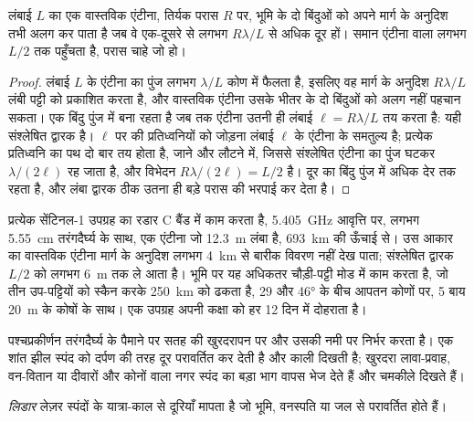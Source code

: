 \begin{proposition}[दिगंश विभेदन]\label{prop:b3:remote-sensing-gis:azimuth}
लंबाई $L$ का एक वास्तविक एंटीना, तिर्यक परास $R$ पर, भूमि के दो बिंदुओं को
अपने मार्ग के अनुदिश तभी अलग कर पाता है जब वे एक-दूसरे से लगभग $R\lambda/L$ से अधिक दूर हों।
समान एंटीना वाला  लगभग $L/2$ तक पहुँचता है,
परास चाहे जो हो।
\end{proposition}

\begin{proof}
लंबाई $L$ के एंटीना का पुंज लगभग
$\lambda/L$ कोण में फैलता है, इसलिए वह मार्ग के अनुदिश $R\lambda/L$ लंबी पट्टी को प्रकाशित करता है, और
वास्तविक एंटीना उसके भीतर के दो बिंदुओं को अलग नहीं पहचान सकता। एक बिंदु पुंज में बना रहता है
जब तक एंटीना उतनी ही लंबाई $\ell = R\lambda/L$ तय करता है:
यही संश्लेषित द्वारक है। $\ell$ पर की प्रतिध्वनियों को जोड़ना
लंबाई $\ell$ के एंटीना के समतुल्य है; प्रत्येक प्रतिध्वनि का पथ
दो बार तय होता है, जाने और लौटने में, जिससे संश्लेषित एंटीना का पुंज
घटकर $\lambda/(2\ell)$ रह जाता है, और विभेदन $R\lambda/(2\ell) =
L/2$ है। दूर का बिंदु पुंज में अधिक देर तक रहता है, और लंबा द्वारक
ठीक उतना ही बड़े परास की भरपाई कर देता है।
\end{proof}

प्रत्येक सेंटिनल-1 उपग्रह का रडार C बैंड में काम करता है,
\qty{5.405}{GHz} आवृत्ति पर, लगभग \qty{5.55}{cm} तरंगदैर्घ्य के साथ, एक एंटीना
जो \qty{12.3}{m} लंबा है, \qty{693}{km} की ऊँचाई से। उस आकार का वास्तविक एंटीना
मार्ग के अनुदिश लगभग \qty{4}{km} से बारीक विवरण नहीं देख पाता;
संश्लेषित द्वारक $L/2$ को लगभग \qty{6}{m} तक ले आता है। भूमि पर यह अधिकतर
चौड़ी-पट्टी मोड में काम करता है, जो तीन उप-पट्टियों को स्कैन करके \qty{250}{km} को ढकता है,
29 और \ang{46} के बीच आपतन कोणों पर, 5 बाय \qty{20}{m} के कोषों के साथ।
एक उपग्रह अपनी कक्षा को हर 12 दिन में दोहराता है।

पश्चप्रकीर्णन तरंगदैर्घ्य के पैमाने पर सतह की खुरदरापन पर
और उसकी नमी पर निर्भर करता है। एक शांत झील स्पंद को दर्पण की तरह दूर परावर्तित कर
देती है और काली दिखती है; खुरदरा लावा-प्रवाह, वन-वितान या दीवारों और कोनों वाला नगर
स्पंद का बड़ा भाग वापस भेज देते हैं और चमकीले दिखते हैं।

\begin{definition}[लिडार]\label{def:b3:remote-sensing-gis:lidar}
\emph{लिडार} लेज़र स्पंदों के यात्रा-काल से दूरियाँ मापता है
जो भूमि, वनस्पति या जल से परावर्तित होते हैं।
\end{definition}


